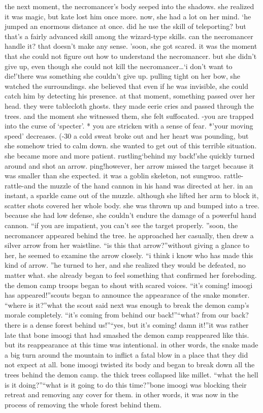 the next moment, the necromancer’s body seeped into the shadows.
 she realized it was magic, but kate lost him once more.
now, she had a lot on her mind.
‘he jumped an enormous distance at once.
 did he use the skill of teleporting? but that’s a fairly advanced skill among the wizard-type skills.
 can the necromancer handle it? that doesn’t make any sense.
’soon, she got scared.
 it was the moment that she could not figure out how to understand the necromancer.
but she didn’t give up, even though she could not kill the necromancer…‘i don’t want to die!’there was something she couldn’t give up.
 pulling tight on her bow, she watched the surroundings.
 she believed that even if he was invisible, she could catch him by detecting his presence.
at that moment, something passed over her head.
 they were tablecloth ghosts.
 they made eerie cries and passed through the trees.
and the moment she witnessed them, she felt suffocated.
-you are trapped into the curse of ‘specter’.
* you are stricken with a sense of fear.
*’your moving speed’ decreases.
 (-30%
 a cold sweat broke out and her heart was pounding, but she somehow tried to calm down.
she wanted to get out of this terrible situation.
 she became more and more patient.
rustling‘behind my back!’she quickly turned around and shot an arrow.
ping!however, her arrow missed the target because it was smaller than she expected.
it was a goblin skeleton, not sungwoo.
rattle- rattle-and the muzzle of the hand cannon in his hand was directed at her.
 in an instant, a sparkle came out of the muzzle.
although she lifted her arm to block it, scatter shots covered her whole body.
she was thrown up and bumped into a tree.
 because she had low defense, she couldn’t endure the damage of a powerful hand cannon.
“if you are impatient, you can’t see the target properly.
”soon, the necromancer appeared behind the tree.
 he approached her casually, then drew a silver arrow from her waistline.
“is this that arrow?”without giving a glance to her, he seemed to examine the arrow closely.
“i think i know who has made this kind of arrow.
”he turned to her, and she realized they would be defeated, no matter what.
she already began to feel something that confirmed her foreboding.
the demon camp troops began to shout with scared voices.
“it’s coming! imoogi has appeared!”scouts began to announce the appearance of the snake monster.
“where is it?”what the scout said next was enough to break the demon camp’s morale completely.
“it’s coming from behind our back!”“what? from our back? there is a dense forest behind us!”“yes, but it’s coming! damn it!”it was rather late that bone imoogi that had smashed the demon camp reappeared like this.
 but its reappearance at this time was intentional.
in other words, the snake made a big turn around the mountain to inflict a fatal blow in a place that they did not expect at all.
bone imoogi twisted its body and began to break down all the trees behind the demon camp.
 the thick trees collapsed like millet.
“what the hell is it doing?”“what is it going to do this time?”bone imoogi was blocking their retreat and removing any cover for them.
in other words, it was now in the process of removing the whole forest behind them.


